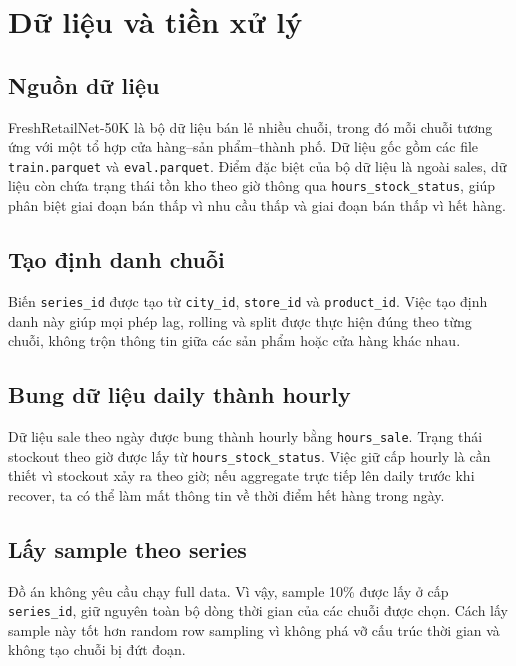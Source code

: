 \section{Dữ liệu và tiền xử lý}

\subsection{Nguồn dữ liệu}

FreshRetailNet-50K là bộ dữ liệu bán lẻ nhiều chuỗi, trong đó mỗi chuỗi tương ứng với một tổ hợp cửa hàng--sản phẩm--thành phố. Dữ liệu gốc gồm các file \texttt{train.parquet} và \texttt{eval.parquet}. Điểm đặc biệt của bộ dữ liệu là ngoài sales, dữ liệu còn chứa trạng thái tồn kho theo giờ thông qua \texttt{hours\_stock\_status}, giúp phân biệt giai đoạn bán thấp vì nhu cầu thấp và giai đoạn bán thấp vì hết hàng.

\subsection{Tạo định danh chuỗi}

Biến \texttt{series\_id} được tạo từ \texttt{city\_id}, \texttt{store\_id} và \texttt{product\_id}. Việc tạo định danh này giúp mọi phép lag, rolling và split được thực hiện đúng theo từng chuỗi, không trộn thông tin giữa các sản phẩm hoặc cửa hàng khác nhau.

\subsection{Bung dữ liệu daily thành hourly}

Dữ liệu sale theo ngày được bung thành hourly bằng \texttt{hours\_sale}. Trạng thái stockout theo giờ được lấy từ \texttt{hours\_stock\_status}. Việc giữ cấp hourly là cần thiết vì stockout xảy ra theo giờ; nếu aggregate trực tiếp lên daily trước khi recover, ta có thể làm mất thông tin về thời điểm hết hàng trong ngày.

\subsection{Lấy sample theo series}

Đồ án không yêu cầu chạy full data. Vì vậy, sample 10\% được lấy ở cấp \texttt{series\_id}, giữ nguyên toàn bộ dòng thời gian của các chuỗi được chọn. Cách lấy sample này tốt hơn random row sampling vì không phá vỡ cấu trúc thời gian và không tạo chuỗi bị đứt đoạn.


